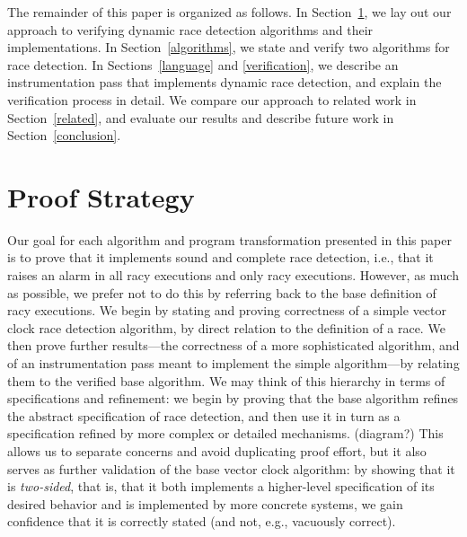 \documentclass[preprint, 10pt]{sigplanconf}
\begin{document}
The remainder of this paper is organized as follows. In Section~\ref{strategy}, we lay out our approach to verifying dynamic race detection algorithms and their implementations. In Section~\ref{algorithms}, we state and verify two algorithms for race detection. In Sections~\ref{language} and \ref{verification}, we describe an instrumentation pass that implements dynamic race detection, and explain the verification process in detail. We compare our approach to related work in Section~\ref{related}, and evaluate our results and describe future work in Section~\ref{conclusion}.

\section{Proof Strategy}
\label{strategy}
Our goal for each algorithm and program transformation presented in this paper is to prove that it implements sound and complete race detection, i.e., that it raises an alarm in all racy executions and only racy executions. However, as much as possible, we prefer not to do this by referring back to the base definition of racy executions. We begin by stating and proving correctness of a simple vector clock race detection algorithm, by direct relation to the definition of a race. We then prove further results---the correctness of a more sophisticated algorithm, and of an instrumentation pass meant to implement the simple algorithm---by relating them to the verified base algorithm. We may think of this hierarchy in terms of specifications and refinement: we begin by proving that the base algorithm refines the abstract specification of race detection, and then use it in turn as a specification refined by more complex or detailed mechanisms. (diagram?) This allows us to separate concerns and avoid duplicating proof effort, but it also serves as further validation of the base vector clock algorithm: by showing that it is \emph{two-sided}, that is, that it both implements a higher-level specification of its desired behavior and is implemented by more concrete systems, we gain confidence that it is correctly stated (and not, e.g., vacuously correct).
\end{document}
